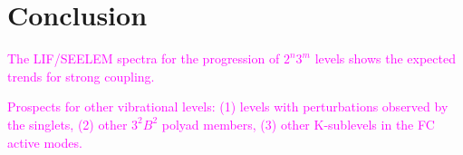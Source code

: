 \documentclass[12pt,draft]{mitthesis}
\newcommand{\TODO} [1]{\textcolor{magenta}{\textbf{TODO:} #1}}
\newcommand{\POINT}[1]{\textcolor{magenta}{#1}}
\begin{document}











\section{Conclusion}

\POINT{The LIF/SEELEM spectra for the progression of $2^n3^m$ levels
  shows the expected trends for strong coupling.}

\POINT{Prospects for other vibrational levels: (1) levels with
  perturbations observed by the singlets, (2) other $3^2B^2$ polyad
  members, (3) other K-sublevels in the FC active modes.}
\end{document}
